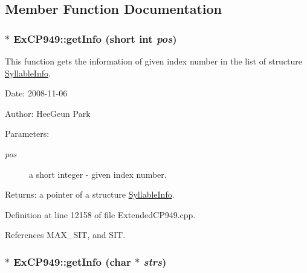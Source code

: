 \subsection{Member Function Documentation}
\hypertarget{classkmaOrange_1_1ExCP949_338fb0a3df2e8ea4ae62655e32040dda}{
\subsubsection[{getInfo}]{ $\ast$ ExCP949::getInfo (short int {\em pos})}}
\label{classkmaOrange_1_1ExCP949_338fb0a3df2e8ea4ae62655e32040dda}


This function gets the information of given index number in the list of structure \hyperlink{structkmaOrange_1_1SyllableInfo}{SyllableInfo}. 

\begin{Desc}
\item[Date:]2008-11-06 \end{Desc}
\begin{Desc}
\item[Author:]HeeGeun Park \end{Desc}
\begin{Desc}
\item[Parameters:]
\begin{description}
\item[{\em pos}]a short integer - given index number. \end{description}
\end{Desc}
\begin{Desc}
\item[Returns:]a pointer of a structure \hyperlink{structkmaOrange_1_1SyllableInfo}{SyllableInfo}. \end{Desc}


Definition at line 12158 of file ExtendedCP949.cpp.

References MAX\_\-SIT, and SIT.\hypertarget{classkmaOrange_1_1ExCP949_2e89cf267a9f3c61e97a7c015f2891b7}{
\subsubsection[{getInfo}]{ $\ast$ ExCP949::getInfo (char $\ast$ {\em strs})}}
\label{classkmaOrange_1_1ExCP949_2e89cf267a9f3c61e97a7c015f2891b7}



